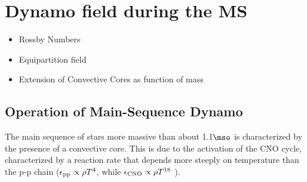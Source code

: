 
  \section{Dynamo field during the MS}
\begin{itemize}
\item Rossby Numbers
\item Equipartition field
\item Extension of Convective Cores as function of mass
\end{itemize}


\subsection{Operation of Main-Sequence Dynamo}
The main sequence of stars more massive than about 1.1$\mso$ is characterized by the presence of a convective core.
This is due to the activation of the CNO cycle, characterized by a reaction rate that depends more steeply on temperature than the p-p chain ($\epsilon_{\rm pp}\propto \rho T^{4}$, while $\epsilon_{\rm CNO}\propto \rho T^{18}$ ).

  
  
  